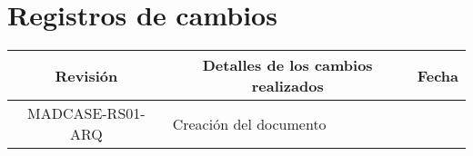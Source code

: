 	\section*{Registros de cambios}
	\label{sec:registro}


	\begin{table}[ht]
		\label{tab:registro}
		\centering
		\begin{tabularx}{\linewidth}{@{}|c|X|c|@{}}
			\hline
			\rowcolor[HTML]{C0C0C0}
			Revisión & \multicolumn{1}{c|}{\cellcolor[HTML]{C0C0C0}Detalles de los cambios realizados} & Fecha      \\ \hline
			MADCASE-RS01-ARQ     & Creación del documento                                 &\fechaInicioName \\ \hline
			\hline

		\end{tabularx}
		\label{sec:cierre}
	\end{table}
